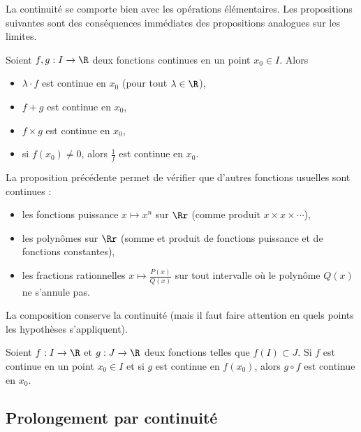 \documentclass[class=report,crop=false]{standalone}
\begin{document}
La continuité se comporte bien avec les opérations élémentaires. Les propositions suivantes sont des conséquences immédiates des propositions analogues sur les limites.
\begin{proposition}
Soient $f,g:I\to\R$ deux fonctions continues en un point $x_0\in I$. Alors
\begin{itemize}
  \item $\lambda\cdot f$ est continue en $x_0$ (pour tout $\lambda\in\R$),
  \item $f+g$ est continue en $x_0$,
  \item $f\times g$ est continue en $x_0$,
  \item si $f(x_0)\neq 0$, alors $\frac1f$ est continue en $x_0$.
\end{itemize}
\end{proposition}

\begin{exemple}
La proposition précédente permet de vérifier que d'autres fonctions usuelles sont continues :
\begin{itemize}
\item les fonctions puissance $x\mapsto x^n$ sur $\Rr$ (comme produit $x \times x \times \cdots$),
\item les polynômes sur $\Rr$ (somme et produit de fonctions puissance et de fonctions constantes),
\item les fractions rationnelles $x\mapsto \frac{P(x)}{Q(x)}$ sur tout intervalle où le
polynôme $Q(x)$ ne s'annule pas.
\end{itemize}
\end{exemple}

La composition conserve la continuité (mais il faut faire attention en quels
points les hypothèses s'appliquent).
\begin{proposition}
Soient $f:I\to\R$ et $g:J\to\R$ deux fonctions telles que $f(I)\subset J$.
Si $f$ est continue en un point $x_0\in I$ et si $g$ est continue en $f(x_0)$,
alors $g\circ f$ est continue en $x_0$.
\end{proposition}

\subsection{Prolongement par continuité}
\end{document}
